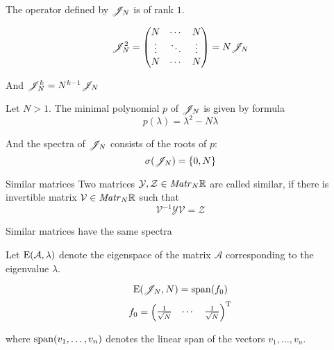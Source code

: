 \documentclass{article}
\begin{document}
The operator defined by \( \mathscr{J}_{N} \) is of rank \( 1 \).

\begin{propose}
    \[\mathscr{J}_{N}^2 =
    \begin{pmatrix}
        N      & \cdots & N \\
        \vdots & \ddots & \vdots \\
        N      & \cdots & N
    \end{pmatrix} = N \mathscr{J}_{N}\]

    And
    \( \mathscr{J}_{N}^k = N^{k-1} \mathscr{J}_{N} \)
\end{propose}

\begin{propose}
    Let \( N>1 \).
    The minimal polynomial \( p \) of \( \mathscr{J}_{N} \) is given by formula
    \[p(\lambda) = \lambda^2 - N \lambda\]

    And the spectra of \( \mathscr{J}_{N} \) consists of the roots of \( p \):
    \[\sigma(\mathscr{J}_{N}) = \{ 0, N \}\]
\end{propose}

\begin{dfn}{Similar matrices}
    Two matrices \( \mathcal Y, \mathcal Z \in\mathit{Matr}_{N} {\mathbb{R}} \) are called similar,
    if there is invertible matrix \( \mathcal V\in\mathit{Matr}_{N} {\mathbb{R}} \) such that
    \[\mathcal V^{-1}\mathcal Y\mathcal V = \mathcal Z\]
\end{dfn}
\begin{propose}
    Similar matrices have the same spectra
\end{propose}

Let \( \mathrm{E}({\mathcal A}, {\lambda}) \) denote the eigenspace of the matrix \( \mathcal A \)
corresponding to the eigenvalue \( \lambda \).

\begin{propose}
    \[\mathrm{E}({\mathscr{J}_{N}}, {N}) = \mathrm{span}({f_0})\]
    \[f_0 = \begin{pmatrix} \frac{1}{\sqrt N} & \cdots & \frac{1}{\sqrt N} \end{pmatrix}^{\mathrm{T}}\]

        where \( \mathrm{span}({v_1, \ldots, v_n}) \) denotes the linear span of the vectors \( v_1, \ldots, v_n \).
\end{propose}
\end{document}
